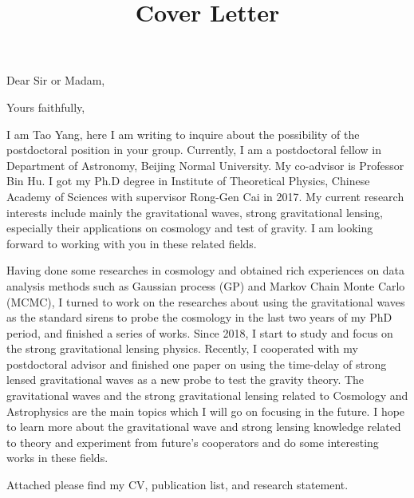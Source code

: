 \documentclass[11pt,letterpaper,sans]{moderncv}   %
\title{Cover Letter}
\begin{document}
\opening{Dear Sir or Madam,}
\closing{Yours faithfully,}
\makelettertitle

I am Tao Yang, here I am writing to inquire about the possibility of the postdoctoral position in your group. Currently, I am a postdoctoral fellow in Department of Astronomy, Beijing Normal University. My co-advisor is Professor Bin Hu.  I got my Ph.D degree in Institute of Theoretical Physics, Chinese
Academy of Sciences  with supervisor Rong-Gen Cai in 2017. My current research interests include mainly the gravitational waves, strong gravitational lensing, especially their applications on cosmology and test of gravity. I am looking forward to working with you in these related fields.

Having done some researches in cosmology and obtained rich experiences on data analysis methods such as
Gaussian process (GP) and Markov Chain Monte Carlo (MCMC), I turned to work on the researches about
using the gravitational waves as the standard sirens to probe the cosmology in the last two years of my PhD
period, and finished a series of works. Since 2018, I start to study and focus on the strong gravitational lensing physics. Recently, I cooperated with my
postdoctoral advisor and finished one paper on using the time-delay of strong lensed gravitational waves as a
new probe to test the gravity theory. The gravitational waves and the strong gravitational lensing related to
Cosmology and Astrophysics are the main topics which I will go on focusing in the future. I hope to learn more about the gravitational wave and strong lensing
knowledge related to theory and experiment from future’s cooperators and do some interesting works in these
fields.

Attached please find my CV, publication list, and research statement.

\vspace{10mm}

\makeletterclosing
\end{document}

